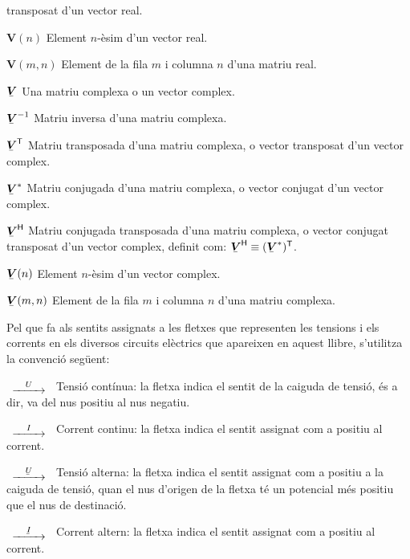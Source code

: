 \begin{list}{}
    transposat d'un vector real.
    \item[$\boldsymbol{V}(n)$] Element $n$-èsim d'un vector real.
    \item[$\boldsymbol{V}(m,n)$] Element de la fila $m$ i columna $n$ d'una matriu real.
    \item[$\mcmplx{V}$] Una matriu complexa o un vector complex.
    \item[$\mcmplx{V}^{-1}$] Matriu inversa d'una matriu complexa.
    \item[$\transp{\mcmplx{V}}$] Matriu transposada d'una matriu complexa, o vector
    transposat d'un vector complex.
    \item[$\mcmplx{V}^*$] Matriu conjugada d'una matriu complexa, o vector
    conjugat d'un vector complex.
    \item[$\hermit{V}$] Matriu conjugada transposada d'una matriu complexa, o vector
    conjugat transposat d'un vector complex, definit com: $\hermit{V} \equiv
    \transp{(\mcmplx{V}^*)}$.
    \item[$\mcmplx{V}(n)$] Element $n$-èsim d'un vector complex.
    \item[$\mcmplx{V}(m,n)$] Element de la fila $m$ i columna $n$ d'una matriu complexa.
\end{list}

Pel que fa als sentits assignats a les fletxes que representen les
tensions i els corrents en els diversos circuits elèctrics que
apareixen en aquest llibre, s'utilitza la convenció següent:

\begin{list}{}
{\setlength{\labelwidth}{15mm} \setlength{\leftmargin}{20mm}
\setlength{\labelsep}{5mm}}
    \item[$\begin{CD} @>U>> \end{CD}$] Tensió contínua: la fletxa indica el sentit
    de la caiguda de tensió, és a dir, va del nus positiu al nus negatiu.
    \item[$\begin{CD} @>I>> \end{CD}$] Corrent
    continu: la fletxa indica el sentit  assignat com a positiu al corrent.
    \item[$\begin{CD} @>\cmplx{U}>> \end{CD}$] Tensió alterna: la fletxa indica el
    sentit assignat com a positiu a la caiguda de tensió, quan el nus d'origen de la fletxa
    té un potencial  més positiu que el nus de destinació.
    \item[$\begin{CD} @>\cmplx{I}>> \end{CD}$] Corrent altern: la fletxa
    indica el sentit  assignat com a positiu al corrent.
\end{list}

